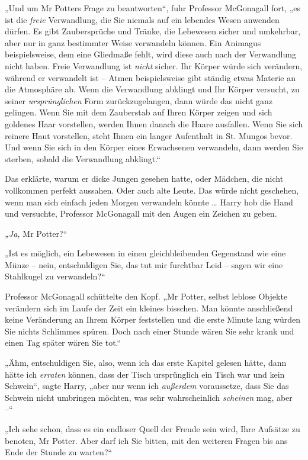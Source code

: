 {„Und um Mr Potters Frage zu beantworten“, fuhr Professor McGonagall fort, „es ist die \emph{freie} Verwandlung, die Sie niemals auf ein lebendes Wesen anwenden dürfen. Es gibt Zaubersprüche und Tränke, die Lebewesen sicher und umkehrbar, aber nur in ganz bestimmter Weise verwandeln können. Ein Animagus beispielsweise, dem eine Gliedmaße fehlt, wird diese auch nach der Verwandlung nicht haben. Freie Verwandlung ist \emph{nicht} sicher. Ihr Körper würde sich verändern, während er verwandelt ist -- Atmen beispielsweise gibt ständig etwas Materie an die Atmosphäre ab. Wenn die Verwandlung abklingt und Ihr Körper versucht, zu seiner \emph{ursprünglichen} Form zurückzugelangen, dann würde das nicht ganz gelingen. Wenn Sie mit dem Zauberstab auf Ihren Körper zeigen und sich goldenes Haar vorstellen, werden Ihnen danach die Haare ausfallen. Wenn Sie sich reinere Haut vorstellen, steht Ihnen ein langer Aufenthalt in St. Mungos bevor. Und wenn Sie sich in den Körper eines Erwachsenen verwandeln, dann werden Sie sterben, sobald die Verwandlung abklingt.“

Das erklärte, warum er dicke Jungen gesehen hatte, oder Mädchen, die nicht vollkommen perfekt aussahen. Oder auch alte Leute. Das würde nicht geschehen, wenn man sich einfach jeden Morgen verwandeln könnte … Harry hob die Hand und versuchte, Professor McGonagall mit den Augen ein Zeichen zu geben.

\emph{„Ja,} Mr Potter?“

„Ist es möglich, ein Lebewesen in einen gleichbleibenden Gegenstand wie eine Münze -- nein, entschuldigen Sie, das tut mir furchtbar Leid -- sagen wir eine Stahlkugel zu verwandeln?“

Professor McGonagall schüttelte den Kopf. „Mr Potter, selbst leblose Objekte verändern sich im Laufe der Zeit ein kleines bisschen. Man könnte anschließend keine Veränderung an Ihrem Körper feststellen und die erste Minute lang würden Sie nichts Schlimmes spüren. Doch nach einer Stunde wären Sie sehr krank und einen Tag später wären Sie tot.“

„Ähm, entschuldigen Sie, also, wenn ich das erste Kapitel gelesen hätte, dann hätte ich \emph{erraten} können, dass der Tisch ursprünglich ein Tisch war und kein Schwein“, sagte Harry, „aber nur wenn ich \emph{außerdem} voraussetze, dass Sie das Schwein nicht umbringen möchten, was sehr wahrscheinlich \emph{scheinen} mag, aber --“

„Ich sehe schon, dass es ein endloser Quell der Freude sein wird, Ihre Aufsätze zu benoten, Mr Potter. Aber darf ich Sie bitten, mit den weiteren Fragen bis ans Ende der Stunde zu warten?“

}
